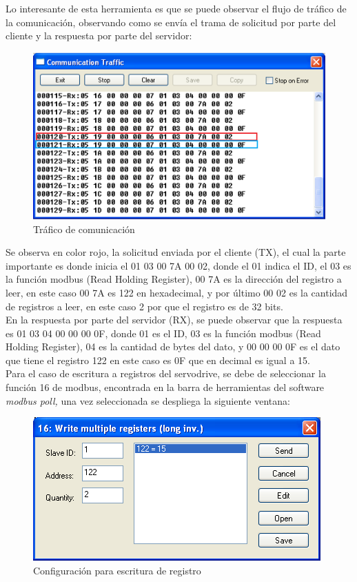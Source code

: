 \documentclass[12pt,titlepage]{article}
\begin{document}
Lo interesante de esta herramienta es que se puede observar el flujo de tráfico de la comunicación, observando como se envía el trama de solicitud por parte del cliente y la respuesta por parte del servidor: \\ 
 \begin{figure}[htbp]
\hspace*{2.8cm} 
\includegraphics[scale=0.88]{Imagen1}
\caption{Tráfico de comunicación}
\end{figure}

Se observa en color rojo, la solicitud enviada por el cliente (TX), el cual la parte importante es donde inicia el 01 03 00 7A 00 02, donde el 01 indica el ID,  el 03 es la función modbus (Read Holding Register), 00 7A es la dirección del registro a leer, en este caso 00 7A es 122 en hexadecimal, y por último 00 02 es la cantidad de registros a leer, en este caso 2 por que el registro es de 32 bits. \\ 

\newpage
En la respuesta por parte del servidor (RX), se puede observar que la respuesta es 01 03 04 00 00 00 0F, donde 01 es el ID, 03 es la función modbus (Read Holding Register), 04 es la cantidad de bytes del dato, y 00 00 00 0F es el dato que tiene el registro 122 en este caso es 0F que en decimal es igual a 15. \\ 

Para el caso de escritura a registros del servodrive, se debe de seleccionar la función 16 de modbus, encontrada en la barra de herramientas del software \textit{modbus poll,} una vez seleccionada se despliega la siguiente ventana: \\ 

 \begin{figure}[htbp]
\hspace*{2.8cm} 
\includegraphics[scale=0.88]{poll2}
\caption{Configuración para escritura de registro}
\end{figure}
\end{document}
